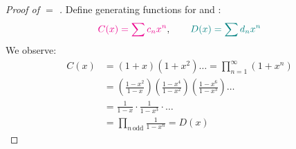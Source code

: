 \documentclass[12pt]{article}
\begin{document}
\begin{proof}[Proof of \rt{\#} $=$ \gt{\#}]
    Define generating functions for  and : \[\textcolor{magenta}{C(x)=\sum c_nx^n}, \qquad \textcolor{teal}{D(x)=\sum d_nx^n}\]
    We observe: \begin{align*}
        C(x) &= (1+x)(1+x^2)\dots = \prod_{n=1}^{\infty}(1+x^n)\\
        &= \left(\frac{1-x^2}{1-x}\right)\left(\frac{1-x^4}{1-x^2}\right)\left(\frac{1-x^6}{1-x^3}\right)\dots\\
        &= \frac{1}{1-x}\cdot\frac{1}{1-x^3}\cdot\dots\\
        &= \prod_{n \, \mathrm{odd}} \frac{1}{1-x^n}=D(x)
    \end{align*}
\end{proof}
\end{document}
